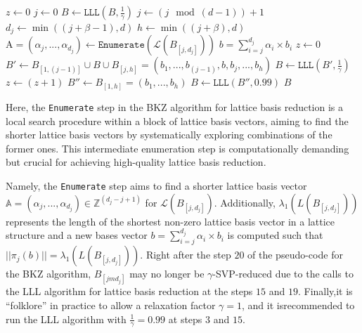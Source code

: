 \documentclass[runningheads]{llncs}
\numberwithin{equation}{section}
\begin{document}
\begin{enumerate}
\begin{algorithm}
\begin{algorithmic}[1]
                \State $z \gets 0$
                \State $j \gets 0$
                \State $B \gets \texttt{LLL}\left(B,\frac{1}{\gamma}\right)$
                    \State $j \gets (j \mod (d - 1)) + 1$
                    \State ${d}_{j} \gets \min\left( (j + \beta - 1), d \right)$
                    \State $h \gets \min\left( (j + \beta), d \right)$
                    \State $\mathrm{A} = ({\alpha}_{j}, ..., {\alpha}_{{d}_{j}}) \gets \texttt{Enumerate}\left( \mathcal{L}({B}_{[j, {d}_{j}]}) \right)$
                        \State $b = \sum_{i = j}^{{d}_{j}} {\alpha}_{i} \times {b}_{i}$
                    \EndIf
                        \State $z \gets 0$
                        \State $B' \gets {B}_{[1, (j - 1)]} \cup B \cup {B}_{[j, h]} = ({b}_{1}, ..., {b}_{(j - 1)}, b, {b}_{j}, ..., {b}_{h})$
                        \State $B \gets \texttt{LLL}\left(B',\frac{1}{\gamma}\right)$
                    \Else
                        \State $z \gets (z + 1)$
                        \State $B'' \gets {B}_{[1, h]} = ({b}_{1}, ..., {b}_{h})$
                        \State $B \gets \texttt{LLL}\left(B'',0.99\right)$
                    \EndIf
                \EndWhile
                \State \Return $B$
            \end{algorithmic}
        \end{algorithm}
        \vspace{-2ex}

        Here, the \texttt{Enumerate} step in the BKZ algorithm for lattice basis reduction is a local search procedure within a block of lattice basis vectors, aiming to find the shorter lattice basis vectors by systematically exploring combinations of the former ones. This intermediate enumeration step is computationally demanding but crucial for achieving high-quality lattice basis reduction.

        Namely, the \texttt{Enumerate} step aims to find a shorter lattice basis vector\break $\mathbb{A} = ({\alpha}_{j}, ..., {\alpha}_{{d}_{j}}) \in {\mathbb{Z}}^{({d}_{j} - j + 1)}$ for $\mathcal{L}\left({B}_{[j, {d}_{j}]}\right)$. Additionally, ${\lambda}_{1}\left( L({B}_{[j,{d}_{j}]}) \right)$ represents the length of the shortest non-zero lattice basis vector in a lattice structure and a new bases vector $b = \sum_{i = j}^{{d}_{j}} {\alpha}_{i} \times {b}_{i}$ is computed such that $|| {\pi}_{j}(b) || = {\lambda}_{1}\left( L({B}_{[j,{d}_{j}]}) \right)$. Right after the step $20$ of the pseudo-code for the BKZ algorithm, ${B}_{[jm {d}_{j}]}$ may no longer be $\gamma$-SVP-reduced due to the calls to the LLL algorithm for lattice basis reduction at the steps $15$ and $19$. Finally,\break it is ``folklore'' in practice to allow a relaxation factor $\gamma = 1$, and it is\break recommended to run the LLL algorithm with $\frac{1}{\gamma} = 0.99$ at steps $3$ and $15$.
    \end{enumerate}
    
\end{document}
